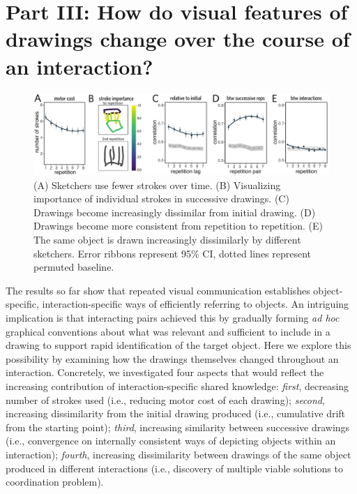 \documentclass[10pt,letterpaper]{article}
\begin{document}
\section{Part III: How do visual features of drawings change over the course of an interaction?}

\begin{figure}
\includegraphics[width=0.96\linewidth]{figures/drawing_changes.pdf}
\caption{(A) Sketchers use fewer strokes over time. (B) Visualizing importance of individual strokes in successive drawings. (C) Drawings become increasingly dissimilar from initial drawing. (D) Drawings become more consistent from repetition to repetition. %
(E) The same object is drawn increasingly dissimilarly by different sketchers. %
Error ribbons represent 95\% CI, dotted lines represent permuted baseline.}
\label{within-across}
\end{figure}

The results so far show that repeated visual communication establishes object-specific, interaction-specific ways of efficiently referring to objects.
An intriguing implication is that interacting pairs achieved this by gradually forming \textit{ad hoc} graphical conventions about what was relevant and sufficient to include in a drawing to support rapid identification of the target object.
Here we explore this possibility by examining how the drawings themselves changed throughout an interaction.
Concretely, we investigated four aspects that would reflect the increasing contribution of interaction-specific shared knowledge: 
\textit{first}, decreasing number of strokes used (i.e., reducing motor cost of each drawing); 
\textit{second}, increasing dissimilarity from the initial drawing produced (i.e., cumulative drift from the starting point); 
\textit{third}, increasing similarity between successive drawings (i.e., convergence on internally consistent ways of depicting objects within an interaction); 
\textit{fourth}, increasing dissimilarity between drawings of the same object produced in different interactions (i.e., discovery of multiple viable solutions to coordination problem).
\end{document}
